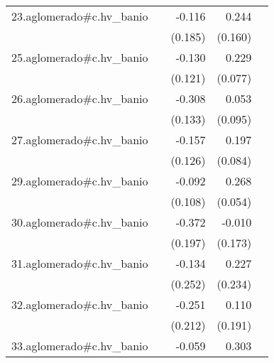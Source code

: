 {\begin{longtable}{l*{4}{D{.}{.}{-1}}}
\addlinespace
23.aglomerado#c.hv\_banio&                     &      -0.116         &       0.244         &                     \\
            &                     &     (0.185)         &     (0.160)         &                     \\
\addlinespace
25.aglomerado#c.hv\_banio&                     &      -0.130         &       0.229\sym{**} &                     \\
            &                     &     (0.121)         &     (0.077)         &                     \\
\addlinespace
26.aglomerado#c.hv\_banio&                     &      -0.308\sym{*}  &       0.053         &                     \\
            &                     &     (0.133)         &     (0.095)         &                     \\
\addlinespace
27.aglomerado#c.hv\_banio&                     &      -0.157         &       0.197\sym{*}  &                     \\
            &                     &     (0.126)         &     (0.084)         &                     \\
\addlinespace
29.aglomerado#c.hv\_banio&                     &      -0.092         &       0.268\sym{***}&                     \\
            &                     &     (0.108)         &     (0.054)         &                     \\
\addlinespace
30.aglomerado#c.hv\_banio&                     &      -0.372         &      -0.010         &                     \\
            &                     &     (0.197)         &     (0.173)         &                     \\
\addlinespace
31.aglomerado#c.hv\_banio&                     &      -0.134         &       0.227         &                     \\
            &                     &     (0.252)         &     (0.234)         &                     \\
\addlinespace
32.aglomerado#c.hv\_banio&                     &      -0.251         &       0.110         &                     \\
            &                     &     (0.212)         &     (0.191)         &                     \\
\addlinespace
33.aglomerado#c.hv\_banio&                     &      -0.059         &       0.303\sym{***}&                     \\

\end{longtable}}
